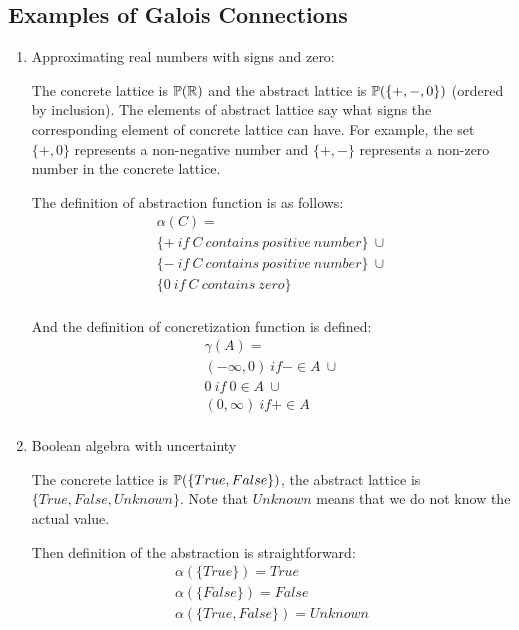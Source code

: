 \subsection*{Examples of Galois Connections}
\begin{enumerate}
    \item Approximating real numbers with signs and zero:

    The concrete lattice is $\mathbb{P}(\mathbb{R})$ and the abstract lattice is $\mathbb{P}(\{+, -, 0\})$ (ordered by
    inclusion).
    The elements of abstract lattice say what signs the corresponding element of concrete lattice can have.
    For example, the set $\{+, 0\}$ represents a non-negative number and $\{+, -\}$ represents a non-zero number in the
    concrete lattice.

    The definition of abstraction function is as follows:
    \begin{gather*}
        \alpha(C) =\\
        \{+ \: if \: C \: contains \: positive \: number\} \: \cup\\
        \{- \: if \: C \: contains \: positive \: number\} \: \cup\\
        \{0 \: if \: C \: contains \: zero\}\\
    \end{gather*}

    And the definition of concretization function is defined:
    \begin{gather*}
        \gamma(A) =\\
        (-\infty, 0) \: if - \in A \: \cup\\
        {0} \: if \: 0 \in A \: \cup\\
        (0, \infty) \: if + \in A \: \\
    \end{gather*}

    \item Boolean algebra with uncertainty

    The concrete lattice is $\mathbb{P}(\{True, False\})$, the abstract lattice is \\ $\{True, False, Unknown\}$.
    Note that $Unknown$ means that we do not know the actual value.

    Then definition of the abstraction is straightforward:
    \begin{gather*}
        \alpha(\{True\}) = True\\
        \alpha(\{False\}) = False\\
        \alpha(\{True, False\}) = Unknown
    \end{gather*}


\end{enumerate}

